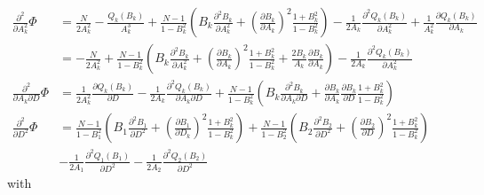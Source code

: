 \documentclass[%
 reprint,
 amsmath,amssymb,
 aps,
]{revtex4-1}
\begin{document}
\begin{equation}
	\begin{aligned}
		\frac{\partial^{2}}{\partial A_{k}^2}\Phi &= \frac{N}{2A_{k}^{2}} - \frac{Q_{k}(B_{k})}{A_{k}^{3}}
		+ \frac{N-1}{1-B_{k}^{2}}\left(B_{k}\frac{\partial^{2} B_{k}}{\partial A_{k}^{2}}
		+ \left(\frac{\partial B_{k}}{\partial A_{k}}\right)^{2}
		\frac{1+B_{k}^{2}}{1-B_{k}^{2}}\right)
		-\frac{1}{2A_{k}}\frac{\partial^{2}Q_{k}(B_{k})}{\partial A_{k}^{2}}
		+\frac{1}{A_{k}^{2}}\frac{\partial Q_{k}(B_{k})}{\partial A_{k}}\\
		&=-\frac{N}{2A_{k}^{2}}
		+ \frac{N-1}{1-B_{k}^{2}}\left(B_{k}\frac{\partial^{2} B_{k}}{\partial A_{k}^{2}}
		+ \left(\frac{\partial B_{k}}{\partial A_{k}}\right)^{2}
		\frac{1+B_{k}^{2}}{1-B_{k}^{2}}+\frac{2B_{k}}{A_{k}}\frac{\partial B_{k}}{\partial A_{k}}\right)
		-\frac{1}{2A_{k}}\frac{\partial^{2}Q_{k}(B_{k})}{\partial A_{k}^{2}}\\
		\frac{\partial^{2}}{\partial A_{k}\partial D}\Phi &= \frac{1}{2A_{k}^{2}}\frac{\partial Q_{k}(B_{k})}{\partial D}
		-\frac{1}{2A_{k}}\frac{\partial^{2} Q_{k}(B_{k})}{\partial A_{k}\partial D}
		+ \frac{N-1}{1-B_{k}^{2}}\left(B_{k}\frac{\partial^{2} B_{k}}{\partial A_{k}\partial D}
		+ \frac{\partial B_{k}}{\partial A_{k}}\frac{\partial B_{k}}{\partial D}
		\frac{1+B_{k}^{2}}{1-B_{k}^{2}}
		\right)\\
		\frac{\partial^{2}}{\partial D^2}\Phi &=
		\frac{N-1}{1-B_{1}^{2}}\left(B_{1}\frac{\partial^{2} B_{1}}{\partial D^{2}}
		+ \left(\frac{\partial B_{1}}{\partial D_{k}}\right)^{2}
		\frac{1+B_{k}^{2}}{1-B_{k}^{2}}
		\right)
		+\frac{N-1}{1-B_{2}^{2}}\left(B_{2}\frac{\partial^{2} B_{2}}{\partial D^{2}}
		+ \left(\frac{\partial B_{2}}{\partial D}\right)^{2}
		\frac{1+B_{k}^{2}}{1-B_{k}^{2}}
		\right)\\
		&- \frac{1}{2A_{1}}\frac{\partial^{2}Q_{1}(B_{1})}{\partial D^{2}}
		- \frac{1}{2A_{2}}\frac{\partial^{2}Q_{2}(B_{2})}{\partial D^{2}}
	\end{aligned}
\end{equation}
with
\end{document}

